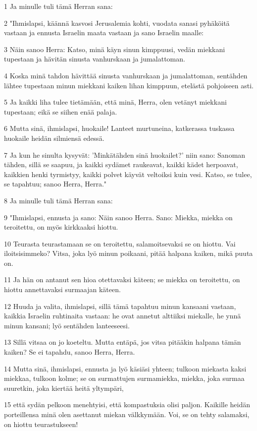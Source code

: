 \par 1 Ja minulle tuli tämä Herran sana:
\par 2 "Ihmislapsi, käännä kasvosi Jerusalemia kohti, vuodata sanasi pyhäköitä vastaan ja ennusta Israelin maata vastaan ja sano Israelin maalle:
\par 3 Näin sanoo Herra: Katso, minä käyn sinun kimppuusi, vedän miekkani tupestaan ja hävitän sinusta vanhurskaan ja jumalattoman.
\par 4 Koska minä tahdon hävittää sinusta vanhurskaan ja jumalattoman, sentähden lähtee tupestaan minun miekkani kaiken lihan kimppuun, etelästä pohjoiseen asti.
\par 5 Ja kaikki liha tulee tietämään, että minä, Herra, olen vetänyt miekkani tupestaan; eikä se siihen enää palaja.
\par 6 Mutta sinä, ihmislapsi, huokaile! Lanteet murtuneina, katkerassa tuskassa huokaile heidän silmiensä edessä.
\par 7 Ja kun he sinulta kysyvät: 'Minkätähden sinä huokailet?' niin sano: Sanoman tähden, sillä se saapuu, ja kaikki sydämet raukeavat, kaikki kädet herpoavat, kaikkien henki tyrmistyy, kaikki polvet käyvät veltoiksi kuin vesi. Katso, se tulee, se tapahtuu; sanoo Herra, Herra."
\par 8 Ja minulle tuli tämä Herran sana:
\par 9 "Ihmislapsi, ennusta ja sano: Näin sanoo Herra. Sano: Miekka, miekka on teroitettu, on myös kirkkaaksi hiottu.
\par 10 Teurasta teurastamaan se on teroitettu, salamoitsevaksi se on hiottu. Vai iloitsisimmeko? Vitsa, joka lyö minun poikaani, pitää halpana kaiken, mikä puuta on.
\par 11 Ja hän on antanut sen hioa otettavaksi käteen; se miekka on teroitettu, on hiottu annettavaksi surmaajan käteen.
\par 12 Huuda ja valita, ihmislapsi, sillä tämä tapahtuu minun kansaani vastaan, kaikkia Israelin ruhtinaita vastaan: he ovat annetut alttiiksi miekalle, he ynnä minun kansani; lyö sentähden lanteeseesi.
\par 13 Sillä vitsaa on jo koeteltu. Mutta entäpä, jos vitsa pitääkin halpana tämän kaiken? Se ei tapahdu, sanoo Herra, Herra.
\par 14 Mutta sinä, ihmislapsi, ennusta ja lyö käsiäsi yhteen; tulkoon miekasta kaksi miekkaa, tulkoon kolme; se on surmattujen surmamiekka, miekka, joka surmaa suuretkin, joka kiertää heitä yltympäri,
\par 15 että sydän pelkoon menehtyisi, että kompastuksia olisi paljon. Kaikille heidän porteillensa minä olen asettanut miekan välkkymään. Voi, se on tehty salamaksi, on hiottu teurastukseen!
